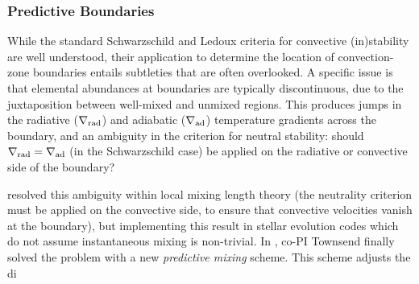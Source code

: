 {\color{brown}
\subsubsection{Predictive Boundaries}

While the standard Schwarzschild and Ledoux criteria for convective (in)stability are well understood, their application to determine the location of convection-zone boundaries entails subtleties that are often overlooked. A specific issue is that elemental abundances at boundaries are typically discontinuous, due to the juxtaposition between well-mixed and unmixed regions. This produces jumps in the radiative ($\nabla_{\rm rad}$) and adiabatic ($\nabla_{\rm ad}$) temperature gradients across the boundary, and an ambiguity in the criterion for neutral stability: should $\nabla_{\rm rad}=\nabla_{\rm ad}$ (in the Schwarzschild case) be applied on the radiative or convective side of the boundary?

\citet{Gabriel:2014} resolved this ambiguity within local mixing length theory (the neutrality criterion must be applied on the convective side, to ensure that convective velocities vanish at the boundary), but implementing this result in stellar evolution codes which do not assume instantaneous mixing is non-trivial. In \citet{Paxton:2017}, co-PI Townsend finally solved the problem with a new \emph{predictive mixing} scheme. This scheme adjusts the di

}